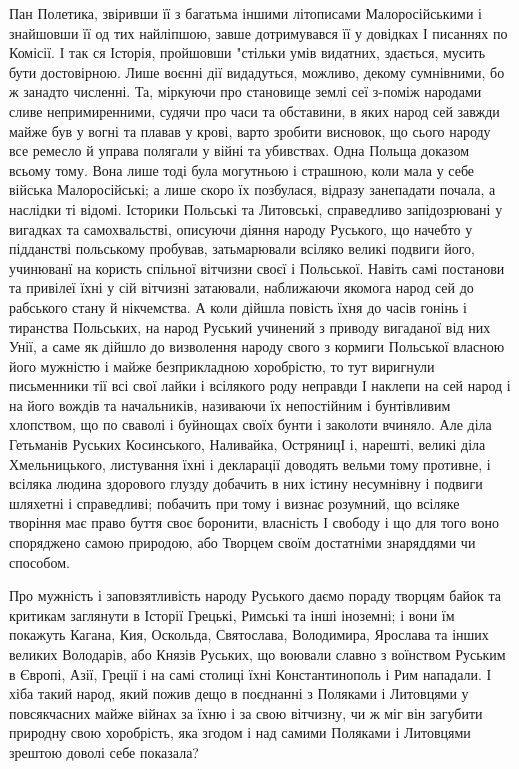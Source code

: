 Пан Полетика, звіривши її з багатьма іншими літописами Малоросійськими і
знайшовши її од тих найліпшою, завше дотримувався її у довідках І писаннях по
Комісії. І так ся Історія, пройшовши "стільки умів видатних, здається, мусить
бути достовірною. Лише воєнні дії видадуться, можливо, декому сумнівними, бо ж
занадто численні. Та, міркуючи про становище землі сеї з-поміж народами сливе
непримиренними, судячи про часи та обставини, в яких народ сей завжди майже був
у вогні та плавав у крові, варто зробити висновок, що сього народу все ремесло
й управа полягали у війні та убивствах. Одна Польща доказом всьому тому. Вона
лише тоді була могутньою і страшною, коли мала у себе війська Малоросійські; а
лише скоро їх позбулася, відразу занепадати почала, а наслідки ті відомі.
Історики Польські та Литовські, справедливо запідозрювані у вигадках та
самохвальстві, описуючи діяння народу Руського, що начебто у підданстві
польському пробував, затьмарювали всіляко великі подвиги його, учинюванї на
користь спільної вітчизни своєї і Польської. Навіть самі постанови та привілеї
їхні у сій вітчизні затаювали, наближаючи якомога народ сей до рабського стану
й нікчемства. А коли дійшла повість їхня до часів гонінь і тиранства Польських,
на народ Руський учинений з приводу вигаданої від них Унії, а саме як дійшло до
визволення народу свого з кормиги Польської власною його мужністю і майже
безприкладною хоробрістю, то тут виригнули письменники тії всі свої лайки і
всілякого роду неправди І наклепи на сей народ і на його вождів та начальників,
називаючи їх непостійним і бунтівливим хлопством, що по сваволі і буйнощах
своїх бунти і заколоти вчиняло. Але діла Гетьманів Руських Косинського,
Наливайка, ОстряницІ і, нарешті, великі діла Хмельницького, листування їхні і
декларації доводять вельми тому противне, і всіляка людина здорового глузду
добачить в них істину несумнівну і подвиги шляхетні і справедливі; побачить при
тому і визнає розумний, що всіляке творіння має право буття своє боронити,
власність І свободу і що для того воно споряджено самою природою, або Творцем
своїм достатніми знаряддями чи способом.

Про мужність і заповзятливість народу Руського даємо пораду творцям байок та
критикам заглянути в Історії Грецькі, Римські та інші іноземні; і вони їм
покажуть Кагана, Кия, Оскольда, Святослава, Володимира, Ярослава та інших
великих Володарів, або Князів Руських, що воювали славно з воїнством Руським в
Європі, Азії, Греції і на самі столиці їхні Константинополь і Рим нападали. І
хіба такий народ, який пожив дещо в поєднанні з Поляками і Литовцями у
повсякчасних майже війнах за їхню і за свою вітчизну, чи ж міг він загубити
природну свою хоробрість, яка згодом і над самими Поляками і Литовцями зрештою
доволі себе показала?

